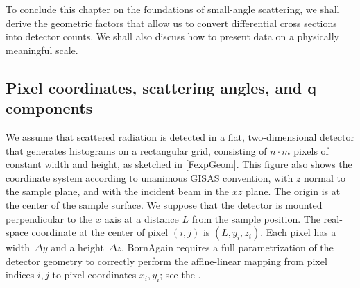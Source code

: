 To conclude this chapter on the foundations of small-angle scattering,
we shall derive the geometric factors
that allow us to convert differential cross sections into detector counts.
We shall also discuss how to present data on a physically meaningful scale.

\subsection{Pixel coordinates, scattering angles, and $\mathbf{q}$ components}

We assume that scattered radiation is detected in a flat,
two-dimensional detector
that generates histograms on a rectangular grid,
consisting of $n\cdot m$ pixels of constant width and height,
as sketched in \cref{FexpGeom}.
This figure also shows the coordinate system
%
%
according to unanimous GISAS convention,
with $z$ normal to the sample plane,
and with the incident beam in the $xz$ plane.
The origin is at the center of the sample surface.
We suppose that the detector is mounted perpendicular to the $x$ axis
at a distance $L$ from the sample position.
The real-space coordinate at the center of pixel $(i,j)$ is $(L,y_i,z_i)$.
Each pixel has a width~$\Delta y$ and a height~$\Delta z$.
%
%
BornAgain requires a full parametrization of the detector geometry
%
to correctly perform the affine-linear mapping from pixel indices $i,j$
to pixel coordinates $x_i,y_i$;
see the .

